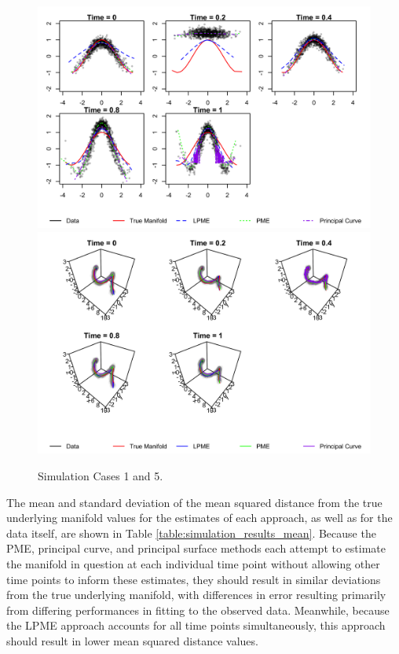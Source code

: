 \documentclass[11pt,reqno]{article}
\theoremstyle{definition}
\begin{document}
\begin{figure}[h]
  \centering
  \includegraphics[width=\textwidth]{sim_case1}
  \includegraphics[width=\textwidth]{sim_case5}
  \caption{Simulation Cases 1 and 5.}
  \label{fig:sim_case1}
\end{figure}

%
The mean and standard deviation of the mean squared distance from the true underlying manifold values for the estimates of each approach, as well as for the data itself, are shown in Table \ref{table:simulation_results_mean}. Because the PME, principal curve, and principal surface methods each attempt to estimate the manifold in question at each individual time point without allowing other time points to inform these estimates, they should result in similar deviations from the true underlying manifold, with differences in error resulting primarily from differing performances in fitting to the observed data. Meanwhile, because the LPME approach accounts for all time points simultaneously, this approach should result in lower mean squared distance values.
\end{document}
